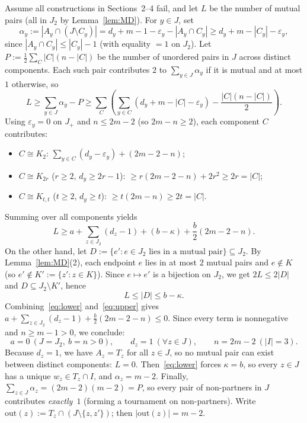 \documentclass[11pt]{article}
\begin{document}
Assume all constructions in Sections~2--4 fail, and let $L$ be the number of mutual pairs (all in $J_2$ by Lemma~\ref{lem:MD}). For $y \in J$, set
\[
\alpha_y := |A_y \cap (J \setminus C_y)| = d_y + m - 1 - \varepsilon_y - |A_y \cap C_y| \ge d_y + m - |C_y| - \varepsilon_y,
\]
since $|A_y \cap C_y| \le |C_y| - 1$ (with equality $= 1$ on $J_2$). Let $P := \frac{1}{2}\sum_C |C|(n - |C|)$ be the number of unordered pairs in $J$ across distinct components. Each such pair contributes $2$ to $\sum_{y \in J} \alpha_y$ if it is mutual and at most $1$ otherwise, so
\[
L \ge \sum_{y \in J} \alpha_y - P \ge \sum_C \left( \sum_{y \in C}(d_y + m - |C| - \varepsilon_y) - \frac{|C|(n - |C|)}{2} \right).
\]
Using $\varepsilon_y = 0$ on $J_+$ and $n \le 2m - 2$ (so $2m - n \ge 2$), each component $C$ contributes:
\begin{itemize}
  \item $C \cong K_2$: $\sum_{y \in C}(d_y - \varepsilon_y) + (2m - 2 - n)$;
  \item $C \cong K_{2r}$ ($r \ge 2$, $d_y \ge 2r-1$): $\ge r(2m - 2 - n) + 2r^2 \ge 2r = |C|$;
  \item $C \cong K_{t,t}$ ($t \ge 2$, $d_y \ge t$): $\ge t(2m - n) \ge 2t = |C|$.
\end{itemize}
Summing over all components yields
\begin{equation}\label{eq:lower}
L \ge a + \sum_{z \in J_2}(d_z - 1) + (b - \kappa) + \frac{b}{2}(2m - 2 - n).
\end{equation}
On the other hand, let $D := \{e' : e \in J_2 \text{ lies in a mutual pair}\} \subseteq J_2$. By Lemma~\ref{lem:MD}(2), each endpoint $e$ lies in at most $2$ mutual pairs and $e \notin K$ (so $e' \notin K' := \{z' : z \in K\}$). Since $e \mapsto e'$ is a bijection on $J_2$, we get $2L \le 2|D|$ and $D \subseteq J_2 \setminus K'$, hence
\begin{equation}\label{eq:upper}
L \le |D| \le b - \kappa.
\end{equation}
Combining~\eqref{eq:lower} and~\eqref{eq:upper} gives $a + \sum_{z \in J_2}(d_z - 1) + \frac{b}{2}(2m - 2 - n) \le 0$. Since every term is nonnegative and $n \ge m-1 > 0$, we conclude:
\[
a = 0 \ (J = J_2, \ b = n > 0), \qquad d_z = 1 \ (\forall z \in J), \qquad n = 2m - 2 \ (|I| = 3).
\]
Because $d_z = 1$, we have $A_z = T_z$ for all $z \in J$, so no mutual pair can exist between distinct components: $L = 0$. Then~\eqref{eq:lower} forces $\kappa = b$, so every $z \in J$ has a unique $w_z \in T_z \cap I$, and $\alpha_z = m - 2$. Finally, $\sum_{z \in J} \alpha_z = (2m-2)(m-2) = P$, so every pair of non-partners in $J$ contributes \emph{exactly}~$1$ (forming a tournament on non-partners). Write $\mathrm{out}(z) := T_z \cap (J \setminus \{z, z'\})$; then $|\mathrm{out}(z)| = m - 2$.
\end{document}
